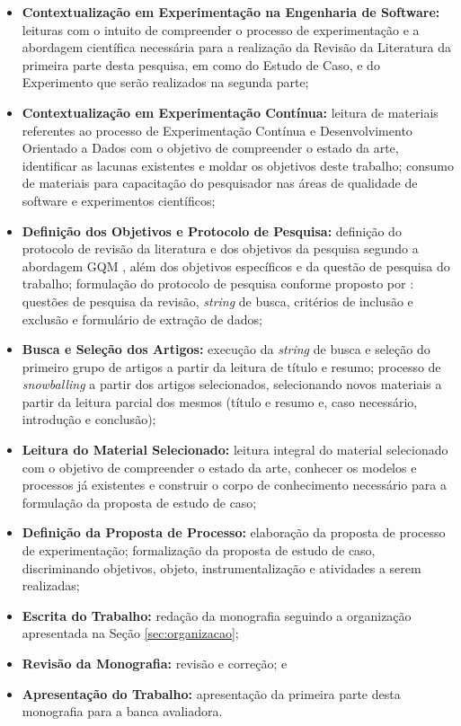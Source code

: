 \begin{itemize}
    \item \textbf{Contextualização em Experimentação na Engenharia de Software:} leituras com o intuito de compreender o processo de experimentação e a abordagem científica necessária para a realização da Revisão da Literatura da primeira parte desta pesquisa, em como do Estudo de Caso, e do Experimento que serão realizados na segunda parte;
    \item \textbf{Contextualização em Experimentação Contínua:} leitura de materiais referentes ao processo de Experimentação Contínua e Desenvolvimento Orientado a Dados com o objetivo de compreender o estado da arte, identificar as lacunas existentes e moldar os objetivos deste trabalho; consumo de materiais para capacitação do pesquisador nas áreas de qualidade de software e experimentos científicos;
    \item \textbf{Definição dos Objetivos e Protocolo de Pesquisa:} definição do protocolo de revisão da literatura e dos objetivos da pesquisa segundo a abordagem GQM \cite{basili_goal_1994}, além dos objetivos específicos e da questão de pesquisa do trabalho; formulação do protocolo de pesquisa conforme proposto por : questões de pesquisa da revisão, \textit{string} de busca, critérios de inclusão e exclusão e formulário de extração de dados;
    \item \textbf{Busca e Seleção dos Artigos:} execução da \textit{string} de busca e seleção do primeiro grupo de artigos a partir da leitura de título e resumo; processo de \textit{snowballing} a partir dos artigos selecionados, selecionando novos materiais a partir da leitura parcial dos mesmos (título e resumo e, caso necessário, introdução e conclusão);
    \item \textbf{Leitura do Material Selecionado:} leitura integral do material selecionado com o objetivo de compreender o estado da arte, conhecer os modelos e processos já existentes e construir o corpo de conhecimento necessário para a formulação da proposta de estudo de caso;
    \item \textbf{Definição da Proposta de Processo:} elaboração da proposta de processo de experimentação; formalização da proposta de estudo de caso, discriminando objetivos, objeto, instrumentalização e atividades a serem realizadas;
    \item \textbf{Escrita do Trabalho:} redação da monografia seguindo a organização apresentada na Seção \ref{sec:organizacao};
    \item \textbf{Revisão da Monografia:} revisão e correção; e
    \item \textbf{Apresentação do Trabalho:} apresentação da primeira parte desta monografia para a banca avaliadora.
\end{itemize}


